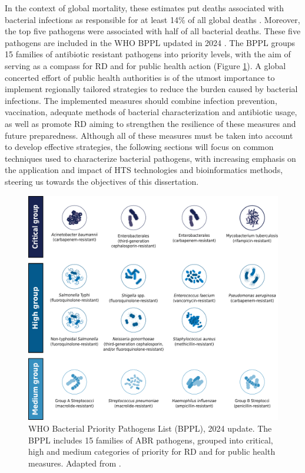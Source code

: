 In the context of global mortality, these estimates put deaths associated with bacterial infections as responsible for at least 14\% of all global deaths \cite{ikuta_global_2022}. Moreover, the top five pathogens were associated with half of all bacterial deaths. These five pathogens are included in the \ac{WHO} \ac{BPPL} updated in 2024 \cite{noauthor_who_2024}. The \ac{BPPL} groups 15 families of antibiotic resistant pathogens into priority levels, with the aim of serving as a compass for \ac{RD} and for public health action (Figure \ref{fig:introduction_figure2}). A global concerted effort of public health authorities is of the utmost importance to implement regionally tailored strategies to reduce the burden caused by bacterial infections. The implemented measures should combine infection prevention, vaccination, adequate methods of bacterial characterization and antibiotic usage, as well as promote \ac{RD} aiming to strengthen the resilience of these measures and future preparedness. Although all of these measures must be taken into account to develop effective strategies, the following sections will focus on common techniques used to characterize bacterial pathogens, with increasing emphasis on the application and impact of \ac{HTS} technologies and bioinformatics methods, steering us towards the objectives of this dissertation.

\begin{figure}[!ht]
    \centering
    \includegraphics[angle=0,width=\textwidth]{figures/introduction/Figure2.pdf}
    \caption[\ac{WHO} Bacterial Priority Pathogens List, 2024 update]{WHO Bacterial Priority Pathogens List (BPPL), 2024 update. The \ac{BPPL} includes 15 families of \ac{ABR} pathogens, grouped into critical, high and medium categories of priority for \ac{RD} and for public health measures. Adapted from \cite{noauthor_who_2024}.}
    \label{fig:introduction_figure2}
\end{figure}

